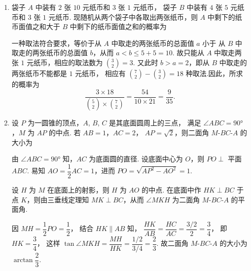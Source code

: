 \documentclass{chsmc}
\begin{document}
\begin{enumerate}
  \item 袋子 $A$ 中装有 $2$ 张 $10$ 元纸币和 $3$ 张 $1$ 元纸币，
    袋子 $B$ 中装有 $4$ 张 $5$ 元纸币和 $3$ 张 $1$ 元纸币.
    现随机从两个袋子中各取出两张纸币，则 $A$ 中剩下的纸币面值之和大于
    $B$ 中剩下的纸币面值之和的概率为\blankline
    \begin{solution}
      一种取法符合要求，等价于从 $A$ 中取走的两张纸币的总面值 $a$ 小于
      从 $B$ 中取走的两张纸币的总面值 $b$，从而 $a < b \leq 5 + 5 = 10$.
      故只能从 $A$ 中取走两张 $1$ 元纸币，相应的取法数为 $\binom{3}{2} = 3$.
      又此时 $b > a = 2$，即从 $B$ 中取走的两张纸币不能都是 $1$ 元纸币，
      相应有 $\binom{7}{2} - \binom{3}{2} = 18$ 种取法.因此，所求的概率为
      \[
        \frac{3 \times 18}{\binom{5}{2} \times \binom{7}{2}}
        = \frac{54}{10 \times 21} = \frac{9}{35}.
      \]
    \end{solution}

  \item 设 $P$ 为一圆锥的顶点，$A$, $B$, $C$ 是其底面圆周上的三点，
    满足 $\angle ABC = 90°$，$M$ 为 $AP$ 的中点. 若 $AB = 1$，$AC = 2$，
    $AP = \sqrt{2}$，则二面角 $M$-$BC$-$A$ 的大小为\blankline
    \begin{solution}
      由 $\angle ABC = 90°$ 知，$AC$ 为底面圆的直径.
      设底面中心为 $O$，则 $PO \perp$ 平面 $ABC$.
      易知 $AO = \dfrac{1}{2}AC = 1$，进而 $PO = \sqrt{AP^2 - AO^2} = 1$.

      设 $H$ 为 $M$ 在底面上的射影，则 $H$ 为 $AO$ 的中点.
      在底面中作 $HK \perp BC$ 于点 $K$，则由三垂线定理知
      $MK \perp BC$，从而 $\angle MKH$ 为二面角 $M$-$BC$-$A$ 的平面角.

      因 $MH = \dfrac{1}{2}PO = \dfrac{1}{2}$，
      结合 $HK \parallel AB$ 知，
      $\dfrac{HK}{AB} = \dfrac{HC}{AC} = \dfrac{3/2}{2} = \dfrac{3}{4}$，
      即 $HK = \dfrac{3}{4}$，
      这样
      $\tan\angle MKH = \dfrac{MH}{HK} = \dfrac{1/2}{3/4} = \dfrac{2}{3}$.
      故二面角 $M$-$BC$-$A$ 的大小为 $\arctan\dfrac{2}{3}$.
    \end{solution}


\end{enumerate}
\end{document}
